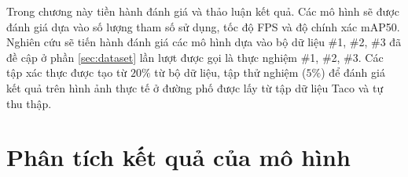 \documentclass[../the.tex]{subfiles}
\begin{document}
{\fontsize{13}{12} \selectfont
Trong chương này tiền hành đánh giá và thảo luận kết quả. Các mô hình sẽ được đánh giá dựa vào số lượng tham số sử dụng, tốc độ FPS và độ chính xác mAP50.
Nghiên cứu sẽ tiến hành đánh giá các mô hình dựa vào bộ dữ liệu \#1, \#2, \#3 đã đề cập ở phần \ref{sec:dataset} lần lượt được gọi là thực nghiệm \#1, \#2, \#3.
Các tập xác thực được tạo từ $20\%$ từ bộ dữ liệu, tập thử nghiệm ($5\%$) để đánh giá kết quả trên hình ảnh thực tế ở đường phố được lấy từ tập dữ liệu Taco và tự thu thập.
}

\section{Phân tích kết quả của mô hình}
\label{sec:result}
\end{document}
